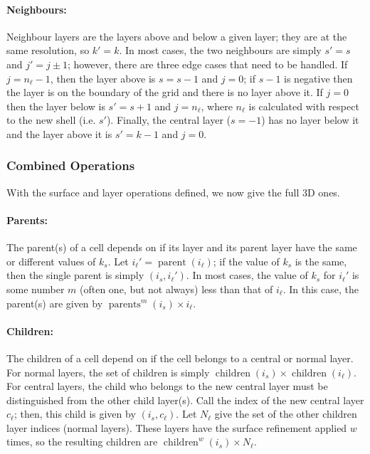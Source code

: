 \paragraph{Neighbours:}
Neighbour layers are the layers above and below a given layer; they are at the same resolution, so $k' = k$.
In most cases, the two neighbours are simply $s' = s$ and $j' = j \pm 1$; however, there are three edge cases that need to be handled.
If $j = n_\ell - 1$, then the layer above is $s = s - 1$ and $j = 0$; if $s - 1$ is negative then the layer is on the boundary of the grid and there is no layer above it.
If $j = 0$ then the layer below is $s' = s + 1$ and $j = n_\ell$, where $n_\ell$ is calculated with respect to the new shell (i.e. $s'$).
Finally, the central layer ($s = -1$) has no layer below it and the layer above it is $s' = k - 1$ and $j = 0$.


\subsubsection{Combined Operations}
With the surface and layer operations defined, we now give the full 3D ones.


\paragraph{Parents:}
The parent(s) of a cell depends on if its layer and its parent layer have the same or different values of $k_s$.
Let $i_\ell' = \operatorname{parent}(i_\ell)$; if the value of $k_s$ is the same, then the single parent is simply $(i_s, i_\ell')$.
In most cases, the value of $k_s$ for $i_\ell'$ is some number $m$ (often one, but not always) less than that of $i_\ell$.
In this case, the parent(s) are given by $\operatorname{parents}^m(i_s) \times i_\ell$.


\paragraph{Children:}
The children of a cell depend on if the cell belongs to a central or normal layer.
For normal layers, the set of children is simply $\operatorname{children}(i_s) \times \operatorname{children}(i_\ell)$.
For central layers, the child who belongs to the new central layer must be distinguished from the other child layer(s).
Call the index of the new central layer $c_\ell$; then, this child is given by $(i_s, c_\ell)$.
Let $ N_\ell$ give the set of the other children layer indices (normal layers).
These layers have the surface refinement applied $w$ times, so the resulting children are $\operatorname{children}^w(i_s) \times N_\ell$.


